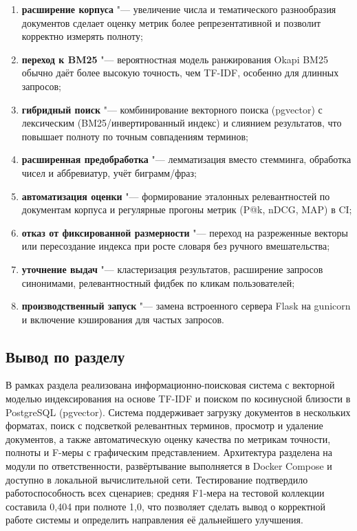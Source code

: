 \begin{enumerate}
	\item \textbf{расширение корпуса} "--- увеличение числа и тематического разнообразия документов сделает оценку метрик более репрезентативной и позволит корректно измерять полноту;
	\item \textbf{переход к BM25} "--- вероятностная модель ранжирования Okapi BM25 обычно даёт более высокую точность, чем TF-IDF, особенно для длинных запросов;
	\item \textbf{гибридный поиск} "--- комбинирование векторного поиска (pgvector) с лексическим (BM25/инвертированный индекс) и слиянием результатов, что повышает полноту по точным совпадениям терминов;
	\item \textbf{расширенная предобработка} "--- лемматизация вместо стемминга, обработка чисел и аббревиатур, учёт биграмм/фраз;
	\item \textbf{автоматизация оценки} "--- формирование эталонных релевантностей по документам корпуса и регулярные прогоны метрик (P@k, nDCG, MAP) в CI;
	\item \textbf{отказ от фиксированной размерности} "--- переход на разреженные векторы или пересоздание индекса при росте словаря без ручного вмешательства;
	\item \textbf{уточнение выдач} "--- кластеризация результатов, расширение запросов синонимами, релевантностный фидбек по кликам пользователей;
	\item \textbf{производственный запуск} "--- замена встроенного сервера Flask на gunicorn и включение кэширования для частых запросов.
\end{enumerate}

\subsection{Вывод по разделу}

В рамках раздела реализована информационно-поисковая система с векторной моделью
индексирования на основе TF-IDF и поиском по косинусной близости в PostgreSQL
(pgvector). Система поддерживает загрузку документов в нескольких форматах, поиск с
подсветкой релевантных терминов, просмотр и удаление документов, а также автоматическую
оценку качества по метрикам точности, полноты и F-меры с графическим представлением.
Архитектура разделена на модули по ответственности, развёртывание выполняется в Docker
Compose и доступно в локальной вычислительной сети. Тестирование подтвердило
работоспособность всех сценариев; средняя F1-мера на тестовой коллекции составила 0,404
при полноте 1,0, что позволяет сделать вывод о корректной работе системы и определить
направления её дальнейшего улучшения.
